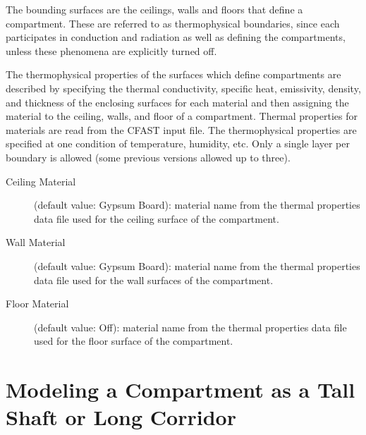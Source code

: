 The bounding surfaces are the ceilings, walls and floors that define a compartment. These are referred to as thermophysical boundaries, since each participates in conduction and radiation as well as defining the compartments, unless these phenomena are explicitly turned off.

The thermophysical properties of the surfaces which define compartments are described by specifying the thermal conductivity, specific heat, emissivity, density, and thickness of the enclosing surfaces for each material and then assigning the material to the ceiling, walls, and floor of a compartment.  Thermal properties for materials are read from the CFAST input file.  The thermophysical properties are specified at one condition of temperature, humidity, etc.  Only a single layer per boundary is allowed (some previous versions allowed up to three).

\begin{description}
\item[Ceiling Material] (default value: Gypsum Board): material name from the thermal properties data file used for the ceiling surface of the compartment.

\item[Wall Material] (default value: Gypsum Board): material name from the thermal properties data file used for the wall surfaces of the compartment.

\item[Floor Material] (default value: Off): material name from the thermal properties data file used for the floor surface of the compartment.
    \end{description}



\section{Modeling a Compartment as a Tall Shaft or Long Corridor}

